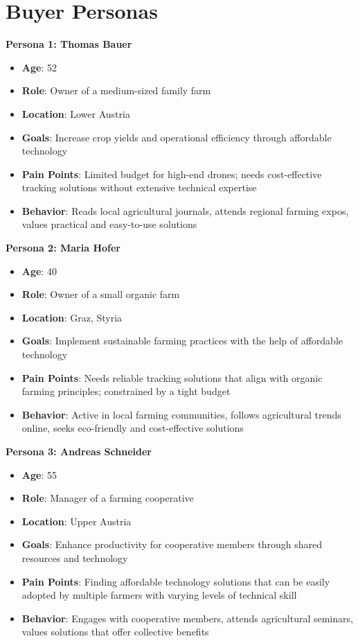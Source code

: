 \section{Buyer Personas}

\textbf{Persona 1: Thomas Bauer}

\begin{itemize}
	\item \textbf{Age}: 52 
	\item \textbf{Role}: Owner of a medium-sized family farm 
	\item \textbf{Location}: Lower Austria
	\item \textbf{Goals}: Increase crop yields and operational efficiency through affordable technology 
	\item \textbf{Pain Points}: Limited budget for high-end drones; needs cost-effective tracking solutions without extensive technical expertise 
	\item \textbf{Behavior}: Reads local agricultural journals, attends regional farming expos, values practical and easy-to-use solutions 
\end{itemize}

\textbf{Persona 2: Maria Hofer}

\begin{itemize} 
	\item \textbf{Age}: 40 
	\item \textbf{Role}: Owner of a small organic farm 
	\item \textbf{Location}: Graz, Styria 
	\item \textbf{Goals}: Implement sustainable farming practices with the help of affordable technology 
	\item \textbf{Pain Points}: Needs reliable tracking solutions that align with organic farming principles; constrained by a tight budget 
	\item \textbf{Behavior}: Active in local farming communities, follows agricultural trends online, seeks eco-friendly and cost-effective solutions 
\end{itemize}

\textbf{Persona 3: Andreas Schneider}

\begin{itemize} 
	\item \textbf{Age}: 55 
	\item \textbf{Role}: Manager of a farming cooperative 
	\item \textbf{Location}: Upper Austria 
	\item \textbf{Goals}: Enhance productivity for cooperative members through shared resources and technology 
	\item \textbf{Pain Points}: Finding affordable technology solutions that can be easily adopted by multiple farmers with varying levels of technical skill 
	\item \textbf{Behavior}: Engages with cooperative members, attends agricultural seminars, values solutions that offer collective benefits 
\end{itemize}


